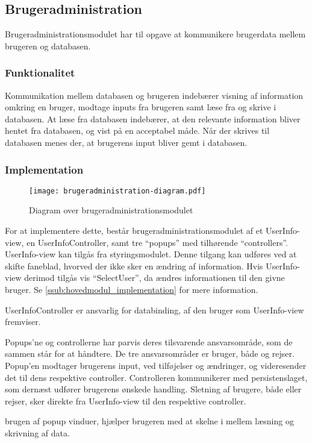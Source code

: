 \subsection{Brugeradministration}
\label{sub:Brugeradministration}

Brugeradministrationsmodulet har til opgave at kommunikere brugerdata mellem brugeren og databasen.

\subsubsection{Funktionalitet}
\label{ssub:Brugeradministration_funktionalitet}

Kommunikation mellem databasen og brugeren indebærer visning af information omkring en bruger, modtage inputs fra brugeren samt læse fra og skrive i databasen. At læse fra databasen indebærer, at den relevante information bliver hentet fra databasen, og vist på en acceptabel måde. Når der skrives til databasen menes der, at brugerens input bliver gemt i databasen.

\subsubsection{Implementation}
\label{ssub:Brugeradministration_implementation}

\begin{figure}
  \centering
  \texttt{[image: brugeradministration-diagram.pdf]}
  \caption{Diagram over brugeradministrationsmodulet}
  \label{fig:brugermod}
\end{figure}

For at implementere dette, består brugeradministrationsmodulet af et UserInfo-view, en UserInfoController, samt tre \enquote{popups} med tilhørende \enquote{controllers}. UserInfo-view kan tilgås fra styringsmodulet. Denne tilgang kan udføres ved at skifte faneblad, hvorved der ikke sker en ændring af information. Hvis UserInfo-view derimod tilgås vis \enquote{SelectUser}, da ændres informationen til den givne bruger. Se \cref{ssub:hovedmodul_implementation} for mere information.

UserInfoController er ansvarlig for databinding, af den bruger som UserInfo-view fremviser.

Popups'ne og controllerne har parvis deres tilsvarende ansvarsområde, som de sammen står for at håndtere. De tre ansvarsområder er bruger, både og rejser. Popup'en modtager brugerens input, ved tilføjelser og ændringer, og videresender det til dens respektive controller. Controlleren kommunikerer med persistenslaget, som dernæst udfører brugerens ønskede handling. Sletning af brugere, både eller rejser, sker direkte fra UserInfo-view til den respektive controller.

brugen af popup vinduer, hjælper brugeren med at skelne i mellem læsning og skrivning af data.
